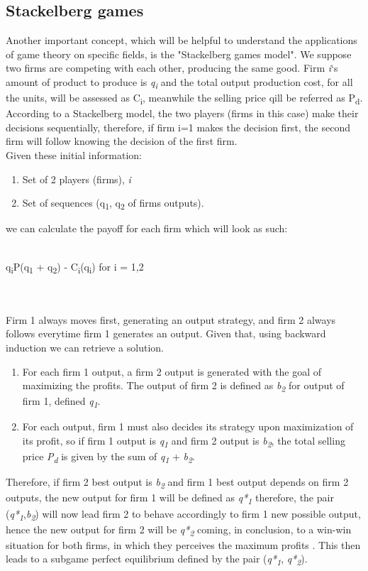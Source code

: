 \documentclass[conference]{IEEEtran}
\begin{document}
\subsection{Stackelberg games}
Another important concept, which will be helpful to understand the applications of game theory on specific fields, is the "Stackelberg games model".
We suppose two firms are competing with each other, producing the same good. Firm \textit{i}`s amount of product to produce is \textit{q\textsubscript{i}} and the total output production cost, for all the units, will be assessed as C\textsubscript{i}, meanwhile the selling price qill be referred as P\textsubscript{d}. According to a Stackelberg model, the two players (firms in this case) make their decisions sequentially, therefore, if firm i=1 makes the decision first, the second firm will follow knowing the decision of the first firm.\\
Given these initial information:
\begin{enumerate}
\item Set of 2 players (firms), \textit{i}
\item Set of sequences (q\textsubscript{1}, q\textsubscript{2} of firms outputs).
\end{enumerate}

 we can calculate the payoff for each firm which will look as such:\\\\
\centerline{q\textsubscript{i}P(q\textsubscript{1} + q\textsubscript{2}) - C\textsubscript{i}(q\textsubscript{i}) for i = 1,2}\\\\
Firm 1 always moves first, generating an output strategy, and firm 2 always follows everytime firm 1 generates an output. Given that, using backward induction we can retrieve a solution.
\begin{enumerate}
\item For each firm 1 output, a firm 2 output is generated with the goal of maximizing the profits. The output of firm 2 is defined as \textit{b\textsubscript{2}} for output of firm 1, defined \textit{q\textsubscript{1}}.
\item For each output, firm 1 must also decides its strategy upon maximization of its profit, so if firm 1 output is \textit{q\textsubscript{1}} and firm 2 output is \textit{b\textsubscript{2}}, the total selling price \textit{P\textsubscript{d}} is given by the sum of \textit{q\textsubscript{1}} + \textit{b\textsubscript{2}}.
\end{enumerate}
Therefore, if firm 2 best output is \textit{b\textsubscript{2}} and firm 1 best output depends on firm 2 outputs, the new output for firm 1 will be defined as \textit{q*\textsubscript{1}}
therefore, the pair (\textit{q*\textsubscript{1}},\textit{b\textsubscript{2}}) will now lead firm 2 to behave accordingly to firm 1 new possible output, hence the new output for firm 2 will be \textit{q*\textsubscript{2}} coming, in conclusion, to a win-win situation for both firms, in which they perceives the maximum profits . This then leads to a subgame perfect equilibrium defined by the pair (\textit{q*\textsubscript{1}}, \textit{q*\textsubscript{2}}).\cite{b8}
\end{document}
